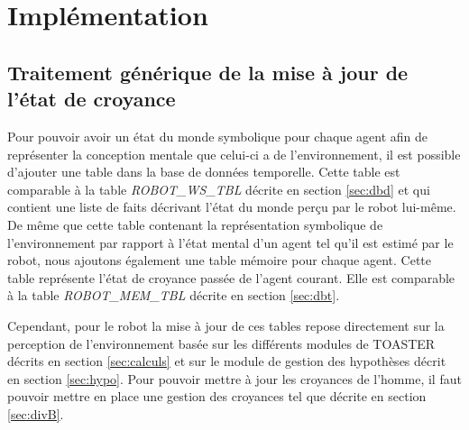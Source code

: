 \documentclass[a4paper,11pt,twoside]{StyleThese}
\begin{document}



\section{Implémentation}
\label{sec:dbPt}

\subsection{Traitement générique de la mise à jour de l'état de croyance}
Pour pouvoir avoir un état du monde symbolique pour chaque agent afin de représenter la conception mentale que celui-ci a de l'environnement, il est possible d'ajouter une table dans la base de données temporelle.
Cette table est comparable à la table \textit{ROBOT\_WS\_TBL} décrite en section \ref{sec:dbd} et qui contient une liste de faits décrivant l'état du monde perçu par le robot lui-même.
De même que cette table contenant la représentation symbolique de l'environnement par rapport à l'état mental d'un agent tel qu'il est estimé par le robot, nous ajoutons également une table mémoire pour chaque agent. Cette table représente l'état de croyance passée de l'agent courant. Elle est comparable à la table \textit{ROBOT\_MEM\_TBL} décrite en section \ref{sec:dbt}.

Cependant, pour le robot la mise à jour de ces tables repose directement sur la perception de l'environnement basée sur les différents modules de TOASTER décrits en section \ref{sec:calculs} et sur le module de gestion des hypothèses décrit en section \ref{sec:hypo}. Pour pouvoir mettre à jour les croyances de l'homme, il faut pouvoir mettre en place une gestion des croyances tel que décrite en section \ref{sec:divB}.
\end{document}
